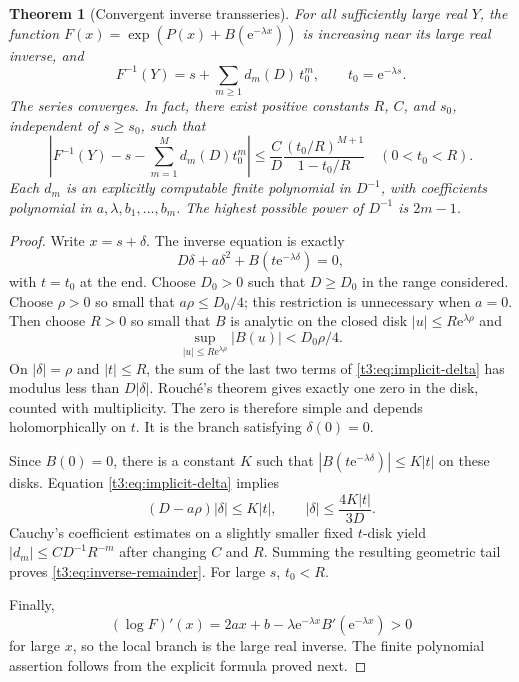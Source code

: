 \documentclass[11pt,openany]{book}
\numberwithin{equation}{chapter}
\theoremstyle{plain}
\newtheorem{theorem}{Theorem}[chapter]
\theoremstyle{definition}
\theoremstyle{remark}
\newcommand{\ee}{\mathrm e}
\begin{document}
\begin{theorem}[Convergent inverse transseries]\label{t3:thm:inverse}
For all sufficiently large real $Y$, the function
$F(x)=\exp(P(x)+B(\ee^{-\lambda x}))$ is increasing near its large real inverse, and
\begin{equation}\label{t3:eq:inverse-full}
 F^{-1}(Y)=s+\sum_{m\ge1}d_m(D)\,t_0^m,
 \qquad t_0=\ee^{-\lambda s}.
\end{equation}
The series converges. In fact, there exist positive constants $R$, $C$, and $s_0$, independent of $s\ge s_0$, such that
\begin{equation}\label{t3:eq:inverse-remainder}
 \left|F^{-1}(Y)-s-\sum_{m=1}^M d_m(D)t_0^m\right|
 \le \frac{C}{D}\frac{(t_0/R)^{M+1}}{1-t_0/R}
 \quad(0<t_0<R).
\end{equation}
Each $d_m$ is an explicitly computable finite polynomial in $D^{-1}$, with coefficients polynomial in $a,\lambda,b_1,\ldots,b_m$. The highest possible power of $D^{-1}$ is $2m-1$.
\end{theorem}

\begin{proof}
Write $x=s+\delta$. The inverse equation is exactly
\begin{equation}\label{t3:eq:implicit-delta}
 D\delta+a\delta^2+B(t\ee^{-\lambda\delta})=0,
\end{equation}
with $t=t_0$ at the end. Choose $D_0>0$ such that $D\ge D_0$ in the range considered. Choose $\rho>0$ so small that $a\rho\le D_0/4$; this restriction is unnecessary when $a=0$. Then choose $R>0$ so small that $B$ is analytic on the closed disk $|u|\le R\ee^{\lambda\rho}$ and
\[
 \sup_{|u|\le R\ee^{\lambda\rho}}|B(u)|<D_0\rho/4.
\]
On $|\delta|=\rho$ and $|t|\le R$, the sum of the last two terms of \eqref{t3:eq:implicit-delta} has modulus less than $D|\delta|$. Rouch\'e's theorem gives exactly one zero in the disk, counted with multiplicity. The zero is therefore simple and depends holomorphically on $t$. It is the branch satisfying $\delta(0)=0$.

Since $B(0)=0$, there is a constant $K$ such that
$|B(t\ee^{-\lambda\delta})|\le K|t|$ on these disks. Equation \eqref{t3:eq:implicit-delta} implies
\[
 (D-a\rho)|\delta|\le K|t|,
 \qquad |\delta|\le \frac{4K|t|}{3D}.
\]
Cauchy's coefficient estimates on a slightly smaller fixed $t$-disk yield
$|d_m|\le C D^{-1}R^{-m}$ after changing $C$ and $R$. Summing the resulting geometric tail proves \eqref{t3:eq:inverse-remainder}. For large $s$, $t_0<R$.

Finally,
\[
 (\log F)'(x)=2ax+b-\lambda\ee^{-\lambda x}B'(\ee^{-\lambda x})>0
\]
for large $x$, so the local branch is the large real inverse. The finite polynomial assertion follows from the explicit formula proved next.
\end{proof}
\end{document}
